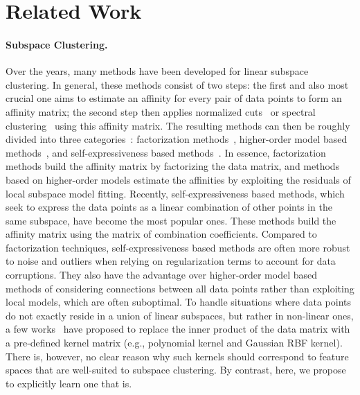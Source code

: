 \documentclass{article}
\begin{document}
\section{Related Work}

\paragraph{Subspace Clustering.} Over the years, many methods have been developed for linear subspace clustering. In general, these methods consist of two steps: the first and also most crucial one aims to estimate an affinity for every pair of data points to form an affinity matrix; the second step then applies normalized cuts~\cite{shi2000normalized} or spectral clustering~\cite{ng2001spectral} using this affinity matrix. The resulting methods can then be roughly divided into three categories~\cite{vidal2011subspace}: factorization methods~\cite{SIM,kanatani2001motion,vidal2008multiframe,mo2012semi,ji2015shape}, higher-order model based methods~\cite{yan2006general,chen2009spectral,Brox_CVPR12,purkait2014clustering}, and self-expressiveness based methods~\cite{elhamifar2009sparse,liu2010robust,lu2012robust,wang2013provable,ji2014efficient,feng2014robust,li2015structured,you2016oracle}. In essence, factorization methods build the affinity matrix by factorizing the data matrix, and methods based on higher-order models estimate the affinities by exploiting the residuals of local subspace model fitting. Recently, self-expressiveness based methods, which seek to express the data points as a linear combination of other points in the same subspace, have become the most popular ones. These methods build the affinity matrix using the matrix of combination coefficients. Compared to factorization techniques, self-expressiveness based methods are often more robust to noise and outliers when relying on regularization terms to account for data corruptions. They also have the advantage over higher-order model based methods of considering connections between all data points rather than exploiting local models, which are often suboptimal.
To handle situations where data points do not exactly reside in a union of linear subspaces, but rather in non-linear ones, a few works~\cite{patel2013latent, patel2014kernel,yin2016kernel,xiao2016robust} have proposed to replace the inner product of the data matrix with a pre-defined kernel matrix (e.g., polynomial kernel and Gaussian RBF kernel). There is, however, no clear reason why such kernels should correspond to feature spaces that are well-suited to subspace clustering. By contrast, here, we propose to explicitly learn one that is.
\end{document}
